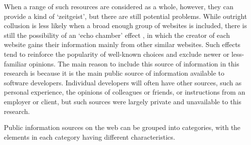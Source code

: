 When a range of such resources are considered as a whole, however, they can provide a kind of `zeitgeist', but there are still potential problems. While outright collusion is less likely when a broad enough group of websites is included, there is still the possibility of an `echo chamber' effect \citep{Cinelli2021}, in which the creator of each website gains their information mainly from other similar websites. Such effects tend to reinforce the popularity of well-known choices and exclude newer or less-familiar opinions. The main reason to include this source of information in this research is because it is the main public source of information available to software developers. Individual developers will often have other sources, such as personal experience, the opinions of colleagues or friends, or instructions from an employer or client, but such sources were largely private and unavailable to this research.

Public information sources on the web can be grouped into categories, with the elements in each category having different characteristics.

